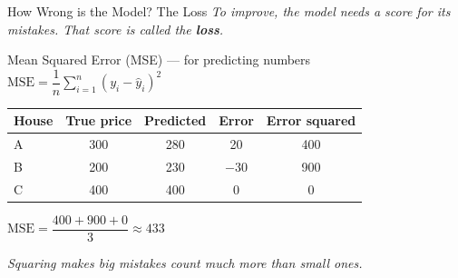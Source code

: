 \begin{frame}{How Wrong is the Model? The Loss}
    \textit{To improve, the model needs a score for its mistakes. That score is called the \textbf{loss}.}

    \vspace{0.3em}
    \begin{block}{Mean Squared Error (MSE) --- for predicting numbers}
        \centering
        $\text{MSE} = \dfrac{1}{n}\displaystyle\sum_{i=1}^{n} (y_i - \hat{y}_i)^2$
    \end{block}

    \centering
    \small
    \renewcommand{\arraystretch}{1.15}
    \begin{tabular}{lcccc}
        \toprule
        \textbf{House} & \textbf{True price} & \textbf{Predicted} & \textbf{Error} & \textbf{Error squared} \\
        \midrule
        A & 300 & 280 & 20 & 400 \\
        B & 200 & 230 & $-30$ & 900 \\
        C & 400 & 400 & 0 & 0 \\
        \bottomrule
    \end{tabular}

    \vspace{0.4em}
    \normalsize
    $\text{MSE} = \dfrac{400 + 900 + 0}{3} \approx 433$

    \vspace{0.2em}
    \textit{Squaring makes big mistakes count much more than small ones.}
\end{frame}

